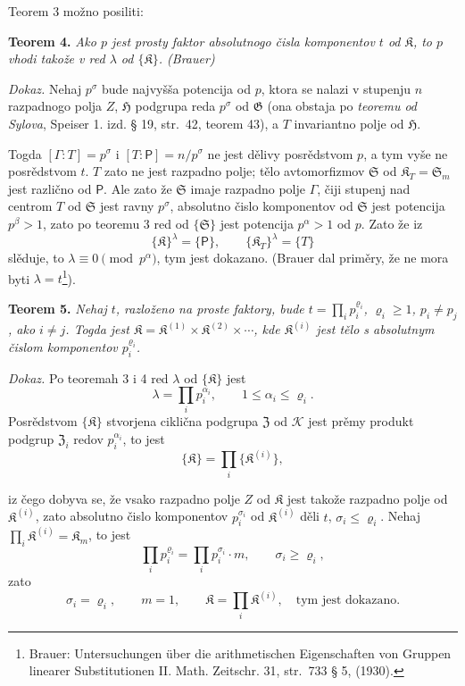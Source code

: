 \documentclass[11pt]{article}
\newcommand{\srcfn}[2]{\footnote{#2}}
\newcommand{\foreign}[1]{#1}
\begin{document}
Teorem 3 možno posiliti:

\textbf{Teorem 4.} \emph{Ako \(p\) jest prosty faktor absolutnogo čisla komponentov \(t\) od \(\mathfrak K\), to \(p\) vhodi takože v red \(\lambda\) od \(\{\mathfrak K\}\). (Brauer)}

\emph{Dokaz.} Nehaj \(p^\sigma\) bude najvyšša potencija od \(p\), ktora se nalazi v stupenju \(n\) razpadnogo polja \(Z\), \(\mathfrak H\) podgrupa reda \(p^\sigma\) od \(\mathfrak G\) (ona obstaja po \emph{teoremu od Sylova}, Speiser 1. izd. § 19, str.~42, teorem 43), a \(T\) invariantno polje od \(\mathfrak H\).

Togda \([\Gamma:T]=p^\sigma\) i \([T:\mathsf P]=n/p^\sigma\) ne jest dělivy posrědstvom \(p\), a tym vyše ne posrědstvom \(t\). \(T\) zato ne jest razpadno polje; tělo avtomorfizmov \(\mathfrak S\) od \(\mathfrak K_T=\mathfrak S_m\) jest različno od \(\mathsf P\). Ale zato že \(\mathfrak S\) imaje razpadno polje \(\Gamma\), čiji stupenj nad centrom \(T\) od \(\mathfrak S\) jest ravny \(p^\sigma\), absolutno čislo komponentov od \(\mathfrak S\) jest potencija \(p^\beta>1\), zato po teoremu 3 red od \(\{\mathfrak S\}\) jest potencija \(p^\alpha>1\) od \(p\). Zato že iz
\[
\{\mathfrak K\}^{\lambda}=\{\mathsf P\},
\qquad
\{\mathfrak K_T\}^{\lambda}=\{T\}
\]
slěduje, to \(\lambda\equiv0\pmod {p^\alpha}\), tym jest dokazano. (Brauer dal priměry, že ne mora byti \(\lambda=t\)\srcfn{1}{\foreign{Brauer: Untersuchungen über die arithmetischen Eigenschaften von Gruppen linearer Substitutionen II. Math. Zeitschr. 31, str.~733 § 5, (1930).}}).

\textbf{Teorem 5.} \emph{Nehaj \(t\), razloženo na proste faktory, bude \(t=\prod_i p_i^{\varrho_i}\), \(\varrho_i\ge1\), \(p_i\ne p_j\), ako \(i\ne j\). Togda jest \(\mathfrak K=\mathfrak K^{(1)}\times\mathfrak K^{(2)}\times\cdots\), kde \(\mathfrak K^{(i)}\) jest tělo s absolutnym čislom komponentov \(p_i^{\varrho_i}\).}

\emph{Dokaz.} Po teoremah 3 i 4 red \(\lambda\) od \(\{\mathfrak K\}\) jest
\[
\lambda=\prod_i p_i^{\alpha_i},\qquad 1\le\alpha_i\le\varrho_i.
\]
Posrědstvom \(\{\mathfrak K\}\) stvorjena ciklična podgrupa \(\mathfrak Z\) od \(\mathscr K\) jest prěmy produkt podgrup \(\mathfrak Z_i\) redov \(p_i^{\alpha_i}\), to jest
\[
\{\mathfrak K\}=\prod_i\{\mathfrak K^{(i)}\},
\]

iz čego dobyva se, že vsako razpadno polje \(Z\) od \(\mathfrak K\) jest takože razpadno polje od \(\mathfrak K^{(i)}\), zato absolutno čislo komponentov \(p_i^{\sigma_i}\) od \(\mathfrak K^{(i)}\) děli \(t\), \(\sigma_i\le\varrho_i\). Nehaj \(\prod_i \mathfrak K^{(i)}=\mathfrak K_m\), to jest
\[
\prod_i p_i^{\varrho_i}=\prod_i p_i^{\sigma_i}\cdot m,
\qquad
\sigma_i\ge\varrho_i,
\]
zato
\[
\sigma_i=\varrho_i,\qquad m=1,\qquad
\mathfrak K=\prod_i \mathfrak K^{(i)},
\quad\text{tym jest dokazano.}
\]
\end{document}
